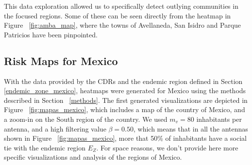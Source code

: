 This data exploration allowed us to specifically detect outlying communities in the focused regions. Some of these can be seen directly from the heatmap in Figure~ \cref{fig:amba_map}, where the towns of Avellaneda, San Isidro and Parque Patricios have been pinpointed.


\newpage

\subsection{Risk Maps for Mexico}

With the data provided by the CDRs and the endemic region defined in Section~ \cref{endemic_zone_mexico}, heatmaps were generated for Mexico using the methods described in Section~ \cref{methods}. The first generated visualizations are depicted in Figure~ \cref{fig:mapas_mexico},
which includes a map of the country of Mexico, and a zoom-in on the South region of the country.
We used $m_v = 80$ inhabitants per antenna, and a high filtering value $\beta = 0.50$, which 
means that in all the antennas shown in Figure~ \cref{fig:mapas_mexico},
more that 50\% of inhabitants have a social tie with the endemic region $E_Z$.
For space reasons, we don't provide here more specific visualizations and analysis of the regions of Mexico.


